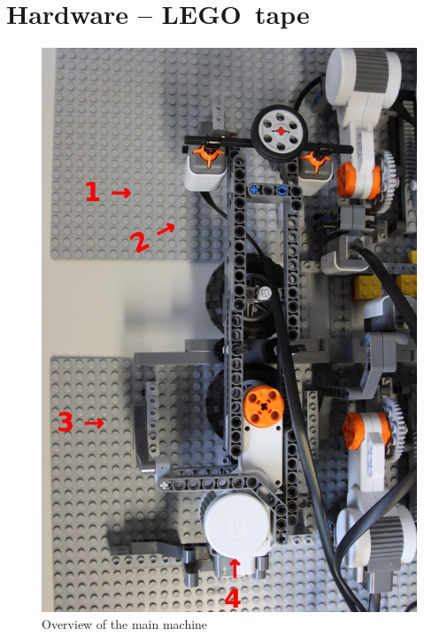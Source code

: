 \documentclass[%
  a4paper,%
  11pt,%
  blue,%
  hyperref	%
  ]{tubsartcl}
\begin{document}
\section{Hardware -- LEGO\textregistered\, tape}

\begin{figure}[!htb]
\begin{center}
\includegraphics[scale=0.4]{graphics/topview.jpg}
\end{center}
\caption{Overview of the main machine}
\end{figure}
\end{document}
